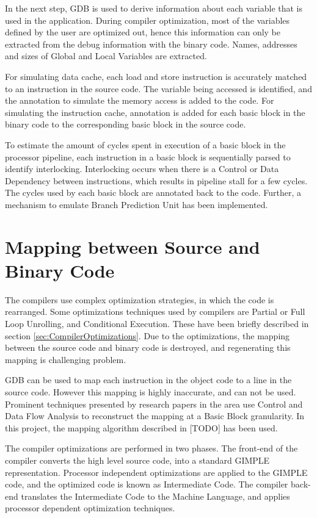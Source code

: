 In the next step, GDB is used to derive information about each variable that is used in the application. During compiler optimization, most of the variables defined by the user are optimized out, hence this information can only be extracted from the debug information with the binary code. Names, addresses and sizes of Global and Local Variables are extracted.

For simulating data cache, each load and store instruction is accurately matched to an instruction in the source code. The variable being accessed is identified, and the annotation to simulate the memory access is added to the code. For simulating the instruction cache, annotation is added for each basic block in the binary code to the corresponding basic block in the source code.

To estimate the amount of cycles spent in execution of a basic block in the processor pipeline, each instruction in a basic block is sequentially parsed to identify interlocking. Interlocking occurs when there is a Control or Data Dependency between instructions, which results in pipeline stall for a few cycles. The cycles used by each basic block are annotated back to the code. Further, a mechanism to emulate Branch Prediction Unit has been implemented. 

\section{Mapping between Source and Binary Code}
The compilers use complex optimization strategies, in which the code is rearranged. Some optimizations techniques used by compilers are Partial or Full Loop Unrolling, and Conditional Execution. These have been briefly described in section \ref{sec:CompilerOptimizations}. Due to the optimizations, the mapping between the source code and binary code is destroyed, and regenerating this mapping is challenging problem.

GDB can be used to map each instruction in the object code to a line in the source code. However this mapping is highly inaccurate, and can not be used. Prominent techniques presented by research papers in the area use Control and Data Flow Analysis to reconstruct the mapping at a Basic Block granularity. In this project, the mapping algorithm described in [TODO] has been used.

The compiler optimizations are performed in two phases. The front-end of the compiler converts the high level source code, into a standard GIMPLE representation. Processor independent optimizations are applied to the GIMPLE code, and the optimized code is known as Intermediate Code. The compiler back-end translates the Intermediate Code to the Machine Language, and applies processor dependent optimization techniques.

